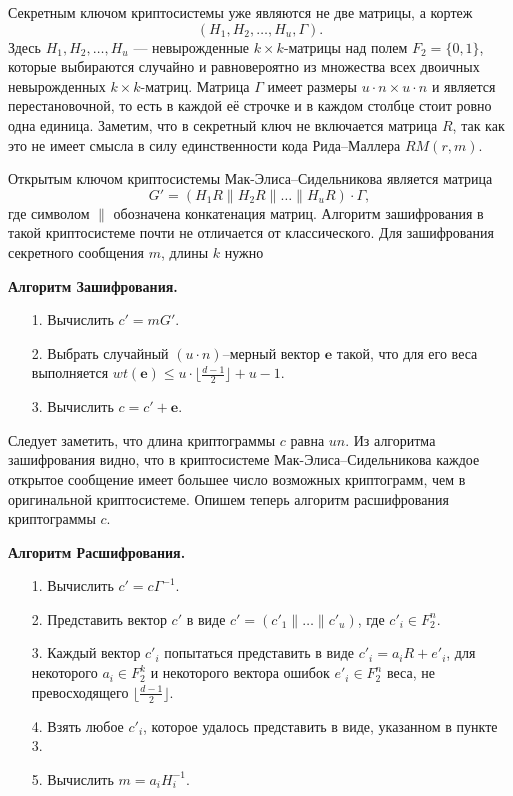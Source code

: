 Секретным ключом криптосистемы уже являются не две матрицы, а
кортеж
$$(H_1,H_2,\ldots,H_u,\Gamma).$$ Здесь $H_1,H_2,\ldots,H_u$
--- невырожденные $k\times k$-матрицы над полем $F_2=\{0,1\}$,
которые выбираются случайно и равновероятно из множества всех
двоичных невырожденных $k\times k$-матриц. Матрица $\Gamma$ имеет
размеры $u\cdot n\times u\cdot n$ и является перестановочной, то
есть в каждой её строчке и в каждом столбце стоит ровно одна
единица. Заметим, что в секретный ключ не включается матрица $R$,
так как это не имеет смысла в силу единственности кода
Рида--Маллера $RM(r,m)$.

Открытым ключом криптосистемы Мак-Элиса--Сидельникова является
матрица
$$G'=(H_1R\|H_2R\|\ldots\|H_uR)\cdot \Gamma,$$
где символом $\|$ обозначена конкатенация матриц. Алгоритм
зашифрования в такой криптосистеме почти не отличается от
классического. Для зашифрования секретного сообщения $m$, длины
$k$ нужно

\textbf{Алгоритм Зашифрования.}
\begin{itemize}
\item[1.] Вычислить $c'=mG'$.
\item[2.] Выбрать случайный $(u\cdot n)$--мерный
вектор $\mathbf e$ такой, что для его веса выполняется $wt(\mathbf
e)\le u\cdot\lfloor\frac{d-1}2\rfloor+u-1$.
\item[3.] Вычислить $c=c'+\mathbf e$.
\end{itemize}


Следует заметить, что длина криптограммы $c$ равна $un$. Из
алгоритма зашифрования видно, что в криптосистеме
Мак-Элиса--Сидельникова каждое открытое сообщение имеет
большее число возможных криптограмм, чем в оригинальной
криптосистеме. Опишем теперь алгоритм расшифрования криптограммы
$c$.

\textbf{Алгоритм Расшифрования.}
\begin{itemize}
\item[1.] Вычислить $c'=c\Gamma^{-1}$.
\item[2.] Представить вектор $c'$ в виде $c'=(c'_1\|\ldots\|c'_u)$,
где $c'_i\in F^n_2$.
\item[3.] Каждый вектор $c'_i$ попытаться представить в виде $c'_i=a_iR+e'_i$,
для некоторого $a_i\in F^k_2$  и некоторого вектора ошибок
$e'_i\in F^n_2$ веса, не превосходящего
$\lfloor\frac{d-1}2\rfloor$.
\item[4.] Взять любое $c'_i$, которое удалось представить в виде,
указанном в пункте 3.
\item[5.] Вычислить $m=a_iH^{-1}_i$.
\end{itemize}


